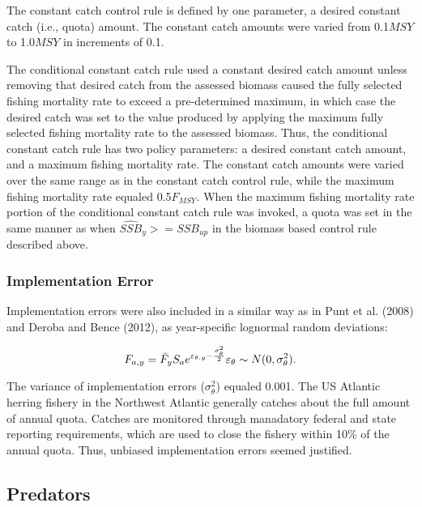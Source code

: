 \documentclass[]{article}
\begin{document}
The constant catch control rule is defined by one parameter, a desired
constant catch (i.e., quota) amount. The constant catch amounts were
varied from 0.1\(MSY\) to 1.0\(MSY\) in increments of 0.1.

The conditional constant catch rule used a constant desired catch amount
unless removing that desired catch from the assessed biomass caused the
fully selected fishing mortality rate to exceed a pre-determined
maximum, in which case the desired catch was set to the value produced
by applying the maximum fully selected fishing mortality rate to the
assessed biomass. Thus, the conditional constant catch rule has two
policy parameters: a desired constant catch amount, and a maximum
fishing mortality rate. The constant catch amounts were varied over the
same range as in the constant catch control rule, while the maximum
fishing mortality rate equaled 0.5\(F_{MSY}\). When the maximum fishing
mortality rate portion of the conditional constant catch rule was
invoked, a quota was set in the same manner as when
\(\widehat{SSB}_y >= SSB_{up}\) in the biomass based control rule
described above.

\subsubsection{Implementation Error}\label{implementation-error}

Implementation errors were also included in a similar way as in Punt et
al. (2008) and Deroba and Bence (2012), as year-specific lognormal
random deviations:

\begin{equation}
F_{a,y}=\bar{F}_yS_ae^{\varepsilon_{\theta,y}-\frac{\sigma_\theta^2}{2}} \\
\varepsilon_{\theta} \sim N(0,\sigma_\theta^2).
\end{equation}

The variance of implementation errors (\(\sigma_\theta^2\)) equaled
0.001. The US Atlantic herring fishery in the Northwest Atlantic
generally catches about the full amount of annual quota. Catches are
monitored through manadatory federal and state reporting requirements,
which are used to close the fishery within 10\% of the annual quota.
Thus, unbiased implementation errors seemed justified.

\subsection{Predators}\label{predators}
\end{document}
